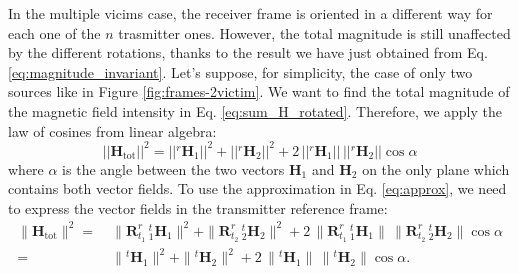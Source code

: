 \noindent
In the multiple vicims case, the receiver frame is oriented in a different way
for each one of the $n$ trasmitter ones. However, the total magnitude is still unaffected by the 
different rotations, thanks to the result we have just obtained from Eq. \ref{eq:magnitude_invariant}.
Let's suppose, for simplicity, the case of only two sources like in Figure \ref{fig:frames-2victim}.
We want to find the total magnitude of the magnetic field intensity in Eq. \ref{eq:sum_H_rotated}.
Therefore, we apply the law of cosines from linear algebra:
\[
|| \mathbf{H}_{\text{tot}}||^2 = ||{}^r \mathbf{H}_1||^2 + ||{}^r \mathbf{H}_2||^2 + 2 \, ||{}^r\mathbf{H}_1|| \, ||{}^r\mathbf{H}_2|| \cos \alpha
\]
where \( \alpha \) is the angle between the two vectors \( \mathbf{H}_1 \) and \( \mathbf{H}_2 \) on the only plane which contains both vector fields.
To use the approximation in Eq. \ref{eq:approx}, we need to express the vector fields
in the transmitter reference frame:
\begin{align*}
\|\mathbf{H}_{\text{tot}}\|^2 = 
&\ \|\mathbf{R}^r_{t_1} \, {}^t_1 \mathbf{H}_1\|^2 + \|\mathbf{R}^r_{t_2} \, {}^t_2 \mathbf{H}_2\|^2  + 2 \, \|\mathbf{R}^r_{t_1} \, {}^t_1 \mathbf{H}_1\| \, \|\mathbf{R}^r_{t_2} \, {}^t_2 \mathbf{H}_2\| \cos \alpha \\
= &\ \|{}^t \mathbf{H}_1\|^2 + \|{}^t \mathbf{H}_2\|^2 + 2 \, \|{}^t \mathbf{H}_1\| \, \|{}^t \mathbf{H}_2\| \cos \alpha.
\end{align*}

